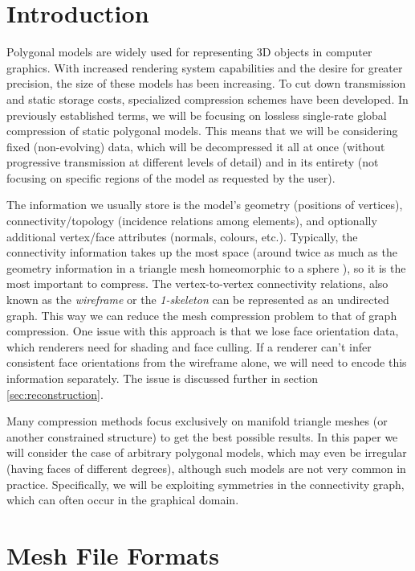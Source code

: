 \documentclass{egpubl}
\begin{document}
\section{Introduction}

Polygonal models are widely used for representing 3D objects in computer graphics. With increased rendering system capabilities and the desire for greater precision, the size of these models has been increasing. To cut down transmission and static storage costs, specialized compression schemes have been developed.
In previously established \cite{meshCompressionSurvey} terms, we will be focusing on lossless single-rate global compression of static polygonal models. This means that we will be considering fixed (non-evolving) data, which will be decompressed it all at once (without progressive transmission at different levels of detail) and in its entirety (not focusing on specific regions of the model as requested by the user).

The information we usually store is the model's geometry (positions of vertices), connectivity/topology (incidence relations among elements), and optionally additional vertex/face attributes (normals, colours, etc.).
Typically, the connectivity information takes up the most space (around twice as much as the geometry information in a triangle mesh homeomorphic to a sphere \cite{rossignac1999edgebreaker}), so it is the most important to compress.
The vertex-to-vertex connectivity relations, also known as the \textit{wireframe} or the \textit{1-skeleton}
can be represented as an undirected graph.
This way we can reduce the mesh compression problem to that of graph compression.
One issue with this approach is that we lose face orientation data, which renderers need for shading and face culling. If a renderer can't infer consistent face orientations from the wireframe alone, we will need to encode this information separately. The issue is discussed further in section \ref{sec:reconstruction}.

Many compression methods focus exclusively on manifold triangle meshes (or another constrained structure) to get the best possible results.  
In this paper we will consider the case of arbitrary polygonal models, which may even be irregular (having faces of different degrees), although such models are not very common in practice. 
Specifically, we will be exploiting symmetries in the connectivity graph, which can often occur in the graphical domain.

\section{Mesh File Formats}
\end{document}
